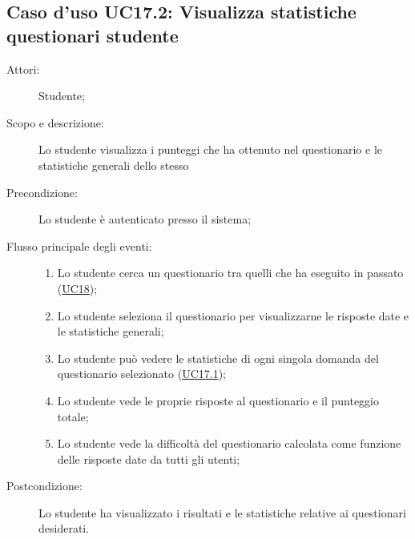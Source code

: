 \subsection{Caso d'uso UC17.2: Visualizza statistiche questionari studente}\begin{description}
\item[Attori:] Studente;
\item[Scopo e descrizione:] Lo studente visualizza i punteggi che ha ottenuto nel questionario e le statistiche generali dello stesso
      \item[Precondizione:] Lo studente è autenticato presso il sistema;

        \item[Flusso principale degli eventi:] \begin{enumerate}
          \item Lo studente cerca un questionario tra quelli che ha eseguito in passato (\hyperlink{UC18}{UC18});
          \item Lo studente seleziona il questionario per visualizzarne le risposte date e le statistiche generali;
          \item Lo studente può vedere le statistiche di ogni singola domanda del questionario selezionato (\hyperlink{UC17.1}{UC17.1});
          \item Lo studente vede le proprie risposte al questionario e il punteggio totale;
          \item Lo studente vede la difficoltà del questionario calcolata come funzione delle risposte date da tutti gli utenti;

      \end{enumerate}
    \item[Postcondizione:] Lo studente ha visualizzato i risultati e le statistiche relative ai questionari desiderati.
  \end{description}
\hypertarget{UC17.3}{}
